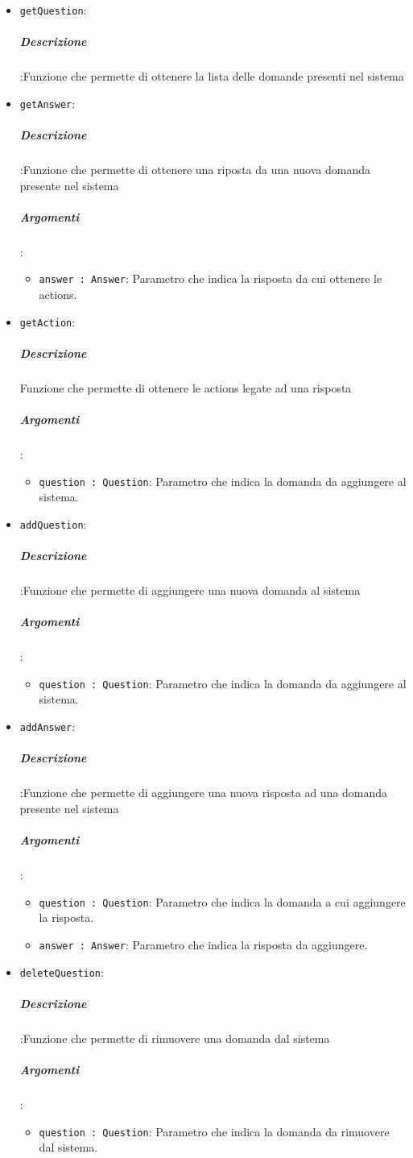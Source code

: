 \documentclass[../DefinizioneDiProdotto_v2.0.0.tex]{subfiles}
\begin{document}
						\begin{itemize}
							\item \texttt{getQuestion}:
							\subparagraph{Descrizione}:Funzione che permette di ottenere la lista delle domande presenti nel sistema
							\item \texttt{getAnswer}:
							\subparagraph{Descrizione}:Funzione che permette di ottenere una riposta da una nuova domanda presente nel sistema
							\subparagraph{Argomenti}:
							\begin{itemize}
								\item \texttt{answer : Answer}: Parametro che indica la risposta da cui ottenere le actions.
							\end{itemize}
							\item \texttt{getAction}:
							\subparagraph{Descrizione}Funzione che permette di ottenere le actions legate ad una risposta
							\subparagraph{Argomenti}:
							\begin{itemize}
								\item \texttt{question : Question}: Parametro che indica la domanda da aggiungere al sistema.
							\end{itemize}

							\item \texttt{addQuestion}:
							\subparagraph{Descrizione}:Funzione che permette di aggiungere una nuova domanda al sistema
							\subparagraph{Argomenti}:
							\begin{itemize}
								\item \texttt{question : Question}: Parametro che indica la domanda da aggiungere al sistema.
							\end{itemize}

							\item \texttt{addAnswer}:
							\subparagraph{Descrizione}:Funzione che permette di aggiungere una nuova risposta ad una domanda presente nel sistema
							\subparagraph{Argomenti}:
							\begin{itemize}
								\item \texttt{question : Question}: Parametro che indica la domanda a cui aggiungere la risposta.
								\item \texttt{answer : Answer}: Parametro che indica la risposta da aggiungere.
							\end{itemize}

							\item \texttt{deleteQuestion}:
							\subparagraph{Descrizione}:Funzione che permette di rimuovere una domanda dal sistema
							\subparagraph{Argomenti}:
							\begin{itemize}
								\item \texttt{question : Question}: Parametro che indica la domanda da rimuovere dal sistema.
							\end{itemize}


\end{itemize}
\end{document}
